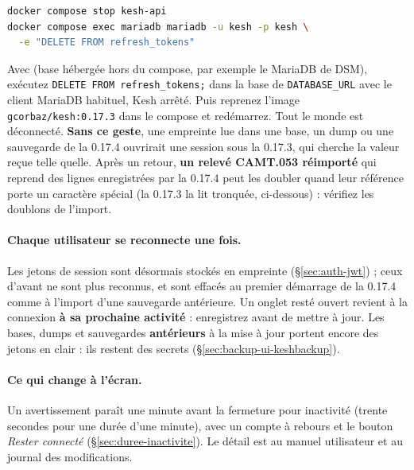 \documentclass[a4paper,11pt,oneside]{article}
\begin{document}
\begin{lstlisting}[language=bash]
docker compose stop kesh-api
docker compose exec mariadb mariadb -u kesh -p kesh \
  -e "DELETE FROM refresh_tokens"
\end{lstlisting}

\begin{sloppypar}
Avec  (base hébergée hors du compose, par exemple le MariaDB de DSM), exécutez \texttt{DELETE FROM refresh\_tokens;} dans la base de \texttt{DATABASE\_URL} avec le client MariaDB habituel, Kesh arrêté. Puis reprenez l'image \texttt{gcorbaz/kesh:0.17.3} dans le compose et redémarrez. Tout le monde est déconnecté. \textbf{Sans ce geste}, une empreinte lue dans une base, un dump ou une sauvegarde de la 0.17.4 ouvrirait une session sous la 0.17.3, qui cherche la valeur reçue telle quelle. Après un retour, \textbf{un relevé CAMT.053 réimporté} qui reprend des lignes enregistrées par la 0.17.4 peut les doubler quand leur référence porte un caractère spécial (la 0.17.3 la lit tronquée, ci-dessous) : vérifiez les doublons de l'import.
\end{sloppypar}

\begin{sloppypar}
\paragraph{Chaque utilisateur se reconnecte une fois.} Les jetons de session sont désormais stockés en empreinte (\S\ref{sec:auth-jwt}) ; ceux d'avant ne sont plus reconnus, et sont effacés au premier démarrage de la 0.17.4 comme à l'import d'une sauvegarde antérieure. Un onglet resté ouvert revient à la connexion \textbf{à sa prochaine activité} : enregistrez avant de mettre à jour. Les bases, dumps et sauvegardes \textbf{antérieurs} à la mise à jour portent encore des jetons en clair : ils restent des secrets (\S\ref{sec:backup-ui-keshbackup}).
\end{sloppypar}

\paragraph{Ce qui change à l'écran.} Un avertissement paraît une minute avant la fermeture pour inactivité (trente secondes pour une durée d'une minute), avec un compte à rebours et le bouton \emph{Rester connecté} (\S\ref{sec:duree-inactivite}). Le détail est au manuel utilisateur et au journal des modifications.
\end{document}
